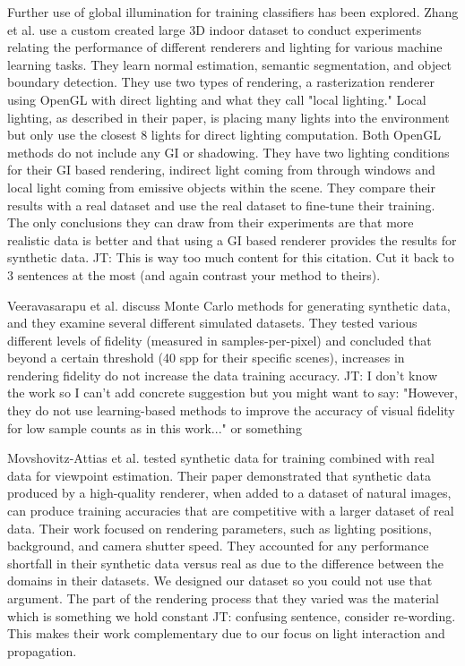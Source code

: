 \documentclass[10pt,twocolumn,letterpaper]{article}
\newcommand{\tompson}[1]{{\color{green} JT: #1}}
\begin{document}
Further use of global illumination for training classifiers has been explored.
Zhang et al. \cite{DBLP:journals/corr/ZhangSYSLJF16} use a custom created large 3D indoor dataset to conduct experiments relating the performance of different renderers and lighting for various machine learning tasks. They learn normal estimation, semantic segmentation, and object boundary detection. They use two types of rendering, a rasterization renderer using OpenGL with direct lighting and what they call "local lighting." Local lighting, as described in their paper, is placing many lights into the environment but only use the closest 8 lights for direct lighting computation.  Both OpenGL methods do not include any GI or shadowing. They have two lighting conditions for their GI based rendering,  indirect light coming from through windows and local light coming from emissive objects within the scene.  They compare their results with a real dataset and use the real dataset to fine-tune their training. The only conclusions they can draw from their experiments are that more realistic data is better and that using a GI based renderer provides the results for synthetic data. \tompson{This is way too much content for this citation. Cut it back to 3 sentences at the most (and again contrast your method to theirs).}


Veeravasarapu et al. \cite{DBLP:journals/corr/VeeravasarapuRR16} discuss Monte Carlo methods for generating synthetic data, and they examine several different simulated datasets. They tested various different levels of fidelity (measured in samples-per-pixel) and concluded that beyond a certain threshold (40 spp for their specific scenes), increases in rendering fidelity do not increase the data training accuracy. \tompson{I don't know the work so I can't add concrete suggestion but you might want to say: "However, they do not use learning-based methods to improve the accuracy of visual fidelity for low sample counts as in this work..." or something}

Movshovitz-Attias et al. \cite{DBLP:journals/corr/Movshovitz-Attias16} tested synthetic data for training combined with real data for viewpoint estimation. Their paper demonstrated that synthetic data produced by a high-quality renderer, when added to a dataset of natural images, can produce training accuracies that are competitive with a larger dataset of real data. Their work focused on rendering parameters, such as lighting positions, background, and camera shutter speed. They accounted for any performance shortfall in their synthetic data versus real as due to the difference between the domains in their datasets.  We designed our dataset so you could not use that argument. The part of the rendering process that they varied was the material which is something we hold constant \tompson{confusing sentence, consider re-wording}. This makes their work complementary due to our focus on light interaction and propagation.
\end{document}
